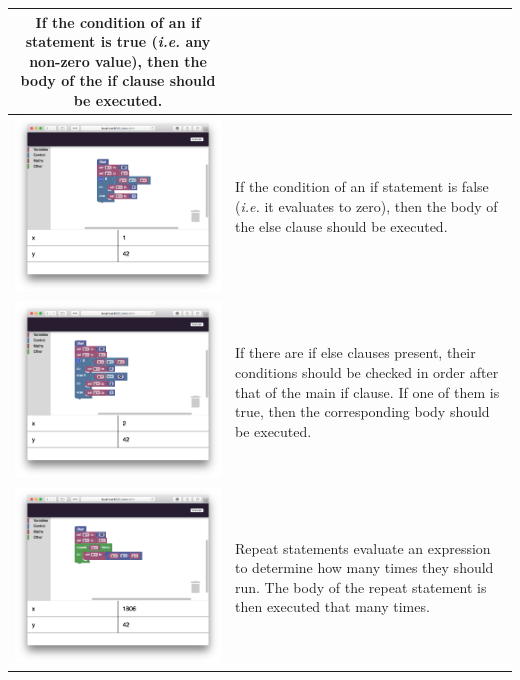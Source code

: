 \documentclass{cs256-shared/cs256}
\begin{document}
\begin{center}
\begin{longtable}[t]{|c|p{5cm}|}
		If the condition of an if statement is true (\emph{i.e.} any non-zero value), then the body of the if clause should be executed. \\ \hline
		\includegraphics[align=t,width=250px]{semantics/4-else.png} &
		If the condition of an if statement is false (\emph{i.e.} it evaluates to zero), then the body of the else clause should be executed. \\ \hline 
		\includegraphics[align=t,width=250px]{semantics/5-ifelse.png} &
		If there are if else clauses present, their conditions should be checked in order after that of the main if clause. If one of them is true, then the corresponding body should be executed. \\ \hline
		\includegraphics[align=t,width=250px]{semantics/6-repeat.png} &
		Repeat statements evaluate an expression to determine how many times they should run. The body of the repeat statement is then executed that many times. \\ \hline 

\end{longtable}
\end{center}
\end{document}
